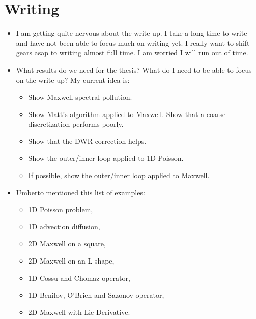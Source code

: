 \documentclass[12pt,a4paper]{article}
\begin{document}
\section{Writing}
\begin{itemize}
    \item I am getting quite nervous about the write up. I take a long time to write and have not been able to focus much on writing yet. I really want to shift gears asap to writing almost full time. I am worried I will run out of time. 
    \item What results do we need for the thesis? What do I need to be able to focus on the write-up? My current idea is:
    \begin{itemize}
        \item Show Maxwell spectral pollution.
        \item Show Matt's algorithm applied to Maxwell. Show that a coarse discretization performs poorly.
        \item Show that the DWR correction helps. 
        \item Show the outer/inner loop applied to 1D Poisson.
        \item If possible, show the outer/inner loop applied to Maxwell.
    \end{itemize}
    \item Umberto mentioned this list of examples:
    \begin{itemize}
        \item 1D Poisson problem,
        \item 1D advection diffusion,
        \item 2D Maxwell on a square,
        \item 2D Maxwell on an L-shape,
        \item 1D Cossu and Chomaz operator,
        \item 1D Benilov, O'Brien and Sazonov operator,
        \item 2D Maxwell with Lie-Derivative. 
    \end{itemize}


\end{itemize}
\end{document}
